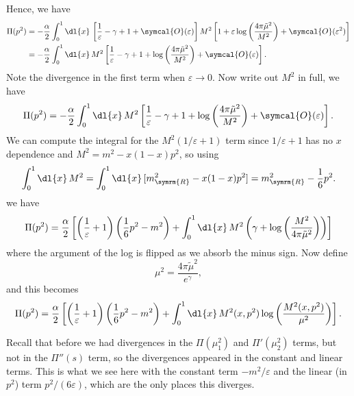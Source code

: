 \documentclass[fleqn]{NotesClass}
\newcommand{\order}{\symcal{O}}
\newcommand{\renormalised}{\symrm{R}}
\begin{document}
    Hence, we have
    \begin{align}
        \Pi(p^2) &= -\frac{\alpha}{2} \int_0^1 \dl{x} \, \left[ \frac{1}{\varepsilon} - \gamma + 1 + \order(\varepsilon) \right] M^2 \left[ 1 + \varepsilon \log\left( \frac{4\pi\tilde{\mu}^2}{M^2} \right) + \order(\varepsilon^2) \right] \notag\\
        &= -\frac{\alpha}{2} \int_0^1 \dl{x} \, M^2 \left[ \frac{1}{\varepsilon} - \gamma + 1 + \log\left( \frac{4\pi\tilde{\mu}^2}{M^2} \right) + \order(\varepsilon) \right].
    \end{align}
    Note the divergence in the first term when \(\varepsilon \to 0\).
    Now write out \(M^2\) in full, we have
    \begin{equation}
        \Pi(p^2) = -\frac{\alpha}{2} \int_0^1 \dl{x} \, M^2 \left[ \frac{1}{\varepsilon} - \gamma + 1 + \log\left( \frac{4\pi\tilde{\mu}^2}{M^2} \right) + \order(\varepsilon) \right].
    \end{equation}
    We can compute the integral for the \(M^2(1/\varepsilon + 1)\) term since \(1/\varepsilon + 1\) has no \(x\) dependence and \(M^2 = m^2 - x(1 - x)p^2\), so using
    \begin{equation}
            \int_0^1 \dl{x} \, M^2 = \int_0^1 \dl{x} \, [m_{\renormalised}^2 - x(1 - x)p^2] = m_{\renormalised}^2 - \frac{1}{6}p^2.
    \end{equation}
    we have
    \begin{equation}
        \Pi(p^2) = \frac{\alpha}{2} \left[ \left( \frac{1}{\varepsilon} + 1 \right)\left( \frac{1}{6}p^2 - m^2 \right) + \int_0^1 \dl{x} \, M^2 \left( \gamma + \log\left( \frac{M^2}{4\pi\tilde{\mu}^2} \right) \right) \right]
    \end{equation}
    where the argument of the log is flipped as we absorb the minus sign.
    Now define
    \begin{equation}
        \mu^2 = \frac{4\pi\tilde{\mu}^2}{e^\gamma},
    \end{equation}
    and this becomes
    \begin{equation}
        \Pi(p^2) = \frac{\alpha}{2} \left[ \left( \frac{1}{\varepsilon} + 1 \right)\left( \frac{1}{6}p^2 - m^2 \right) + \int_0^1 \dl{x} \, M^2(x, p^2) \log\left( \frac{M^2(x, p^2)}{\mu^2} \right) \right].
    \end{equation}
    
    Recall that before we had divergences in the \(\Pi(\mu_1^2)\) and \(\Pi'(\mu_2^2)\) terms, but not in the \(\Pi''(s)\) term, so the divergences appeared in the constant and linear terms.
    This is what we see here with the constant term \(-m^2/\varepsilon\) and the linear (in \(p^2\)) term \(p^2/(6\varepsilon)\), which are the only places this diverges.
    
\end{document}

